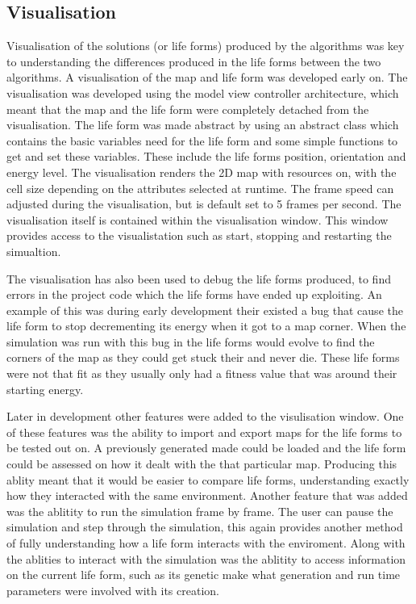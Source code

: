\documentclass[12pt]{article}
\begin{document}
\subsection{Visualisation}
Visualisation of the solutions (or life forms) produced by the algorithms was key
to understanding the differences produced in the life forms between the two algorithms. A visualisation of the map and life form
was developed early on. The visualisation was developed using the model view controller architecture,
which meant that the map and the life form were completely detached from the visualisation.
The life form was made abstract by using an abstract class which contains the basic variables need for the life
form and some simple functions to get and set these variables. These include the life forms position, orientation
and energy level. The visualisation renders the 2D map with resources on, with the cell size depending on the attributes selected at runtime. The frame speed can
adjusted during the visualisation, but is default set to 5 frames per second. The visualisation itself is contained within the visualisation window. This window
provides access to the visualistation such as start, stopping and restarting the simualtion.


The visualisation has also been used to debug the life forms produced, to find errors in the project code which the life forms have ended up exploiting. An example
of this was during early development their existed a bug that cause the life form to stop decrementing its energy when it got to a map corner. When the simulation
was run with this bug in the life forms would evolve to find the corners of the map as they could get stuck their and never die. These life forms were not that fit 
as they usually only had a fitness value that was around their starting energy.

Later in development other features were added to the visulisation window. One of these features was the ability to import and export maps for the life forms to be
tested out on. A previously generated made could be loaded and the life form could be assessed on how it dealt with the that particular map. Producing this ablity meant that it would be easier to compare life forms, understanding exactly how they interacted with the same environment.
Another feature that was added was the ablitity to run the simulation frame by frame. The user can pause the simulation and step through the simulation, this again provides another method of fully understanding how a life form interacts with the enviroment. 
Along with the ablities to interact with the simulation was the ablitity to access information on the current life form, such as its genetic make what generation
and run time parameters were involved with its creation.
\end{document}
